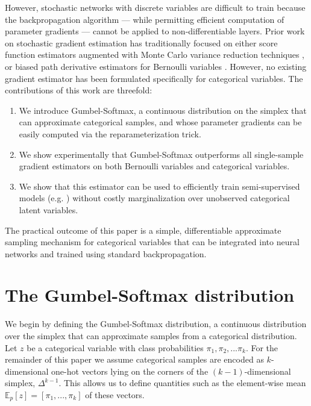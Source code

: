 \documentclass{article} %
\begin{document}
However, stochastic networks with discrete variables are difficult to train because the backpropagation algorithm --- while permitting efficient computation of parameter gradients --- cannot be applied to non-differentiable layers. Prior work on stochastic gradient estimation has traditionally focused on either score function estimators augmented with Monte Carlo variance reduction techniques \citep{2012arXiv1206.6430P,NVIL,gu2016,DARN}, or biased path derivative estimators for Bernoulli variables \citep{DBLP:journals/corr/BengioLC13}. However, no existing gradient estimator has been formulated specifically for categorical variables. The contributions of this work are threefold:
\begin{enumerate}
  \item We introduce Gumbel-Softmax, a continuous distribution on the simplex that can approximate categorical samples, and whose parameter gradients can be easily computed via the reparameterization trick.
  \item We show experimentally that Gumbel-Softmax outperforms all single-sample gradient estimators on both Bernoulli variables and categorical variables.
  \item We show that this estimator can be used to efficiently train semi-supervised models (e.g. \citet{kingma_ssvae}) without costly marginalization over unobserved categorical latent variables. 
\end{enumerate}


The practical outcome of this paper is a simple, differentiable approximate sampling mechanism for categorical variables that can be integrated into neural networks and trained using standard backpropagation.

\section{The Gumbel-Softmax distribution}
We begin by defining the Gumbel-Softmax distribution, a continuous distribution over the simplex that can approximate samples from a categorical distribution. %
Let $z$ be a categorical variable with class probabilities $\pi_1,\pi_2,...\pi_k$. For the remainder of this paper we assume categorical samples are encoded as $k$-dimensional one-hot vectors lying on the corners of the $(k-1)$-dimensional simplex, $\Delta^{k-1}$. This allows us to define quantities such as the element-wise mean $\mathbb{E}_p[z] = \left[\pi_1, ..., \pi_k\right]$ of these vectors.
\end{document}
